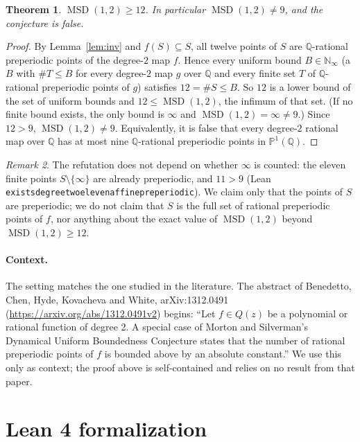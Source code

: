 \documentclass[11pt]{article}
\newtheorem{theorem}{Theorem}
\theoremstyle{definition}
\theoremstyle{remark}
\newtheorem{remark}[theorem]{Remark}
\renewcommand{\_}{\oldus\allowbreak}
\newcommand{\MSD}{\operatorname{MSD}}
\newcommand{\PP}{\mathbb{P}^1(\mathbb{Q})}
\newcommand{\Q}{\mathbb{Q}}
\begin{document}
\begin{theorem}\label{thm:main}
$\MSD(1,2)\ge 12$. In particular $\MSD(1,2)\ne 9$, and the conjecture is false.
\end{theorem}

\begin{proof}
By Lemma~\ref{lem:inv} and $f(S)\subseteq S$, all twelve points of $S$ are $\Q$-rational preperiodic points
of the degree-$2$ map $f$. Hence every uniform bound $B\in\mathbb{N}_\infty$ (a $B$ with
$\#T\le B$ for every degree-$2$ map $g$ over $\Q$ and every finite set $T$ of $\Q$-rational preperiodic
points of $g$) satisfies $12 = \#S \le B$. So $12$ is a lower bound of the set of uniform bounds and
$12\le\MSD(1,2)$, the infimum of that set. (If no finite bound exists, the only bound is $\infty$ and
$\MSD(1,2)=\infty\ne 9$.) Since $12 > 9$, $\MSD(1,2)\ne 9$. Equivalently, it is false that every degree-$2$
rational map over $\Q$ has at most nine $\Q$-rational preperiodic points in $\PP$.
\end{proof}

\begin{remark}
The refutation does not depend on whether $\infty$ is counted: the eleven finite points
$S\setminus\{\infty\}$ are already preperiodic, and $11>9$ (Lean
\texttt{exists\_degree\_two\_eleven\_affine\_preperiodic}). We claim only that the points of $S$ are
preperiodic; we do not claim that $S$ is the full set of rational preperiodic points of $f$, nor anything
about the exact value of $\MSD(1,2)$ beyond $\MSD(1,2)\ge 12$.
\end{remark}

\paragraph{Context.} The setting matches the one studied in the literature. The abstract of Benedetto,
Chen, Hyde, Kovacheva and White, arXiv:1312.0491
(\url{https://arxiv.org/abs/1312.0491v2}) begins: ``Let $f \in Q(z)$ be a polynomial or rational
function of degree 2. A special case of Morton and Silverman's Dynamical Uniform Boundedness Conjecture
states that the number of rational preperiodic points of $f$ is bounded above by an absolute constant.''
We use this only as context; the proof above is self-contained and relies on no result from that paper.

\section{Lean 4 formalization}
\end{document}
